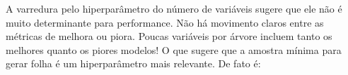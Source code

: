 \begin{figure}[H]
    \centering
    
\end{figure}

A varredura pelo hiperparâmetro do número de variáveis sugere que ele não é muito determinante para performance. Não há movimento claros entre as métricas de melhora ou piora. Poucas variáveis por árvore incluem tanto os melhores quanto os piores modelos! O que sugere que a amostra mínima para gerar folha é um hiperparâmetro mais relevante. De fato é:


\begin{figure}[H]
    \centering
\end{figure}

